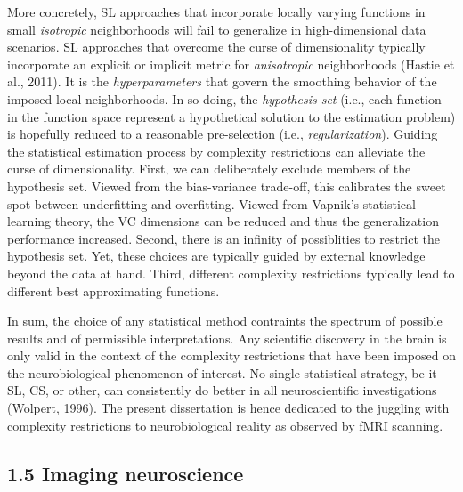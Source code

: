 \documentclass[authoryear,review,3p]{elsarticle}
\begin{document}
More concretely,
SL approaches that incorporate locally varying functions
in small \textit{isotropic} neighborhoods
will fail to generalize in high-dimensional data scenarios.
SL approaches that overcome the curse of dimensionality typically
incorporate an explicit or implicit metric for
\textit{anisotropic} neighborhoods
(Hastie et al., 2011).
%
It is the \textit{hyperparameters} that govern the
smoothing behavior of the imposed local neighborhoods.
%
In so doing,
the \textit{hypothesis set} (i.e., each function in the function space
represent a hypothetical solution to
the estimation problem) is hopefully reduced to
a reasonable pre-selection (i.e., \textit{regularization}).
%
Guiding the statistical estimation process by
complexity restrictions can alleviate the curse of dimensionality.
First,
we can deliberately exclude members of the hypothesis set.
Viewed from the bias-variance trade-off, this calibrates
the sweet spot between underfitting and overfitting.
Viewed from Vapnik's statistical learning theory,
the VC dimensions can be reduced and thus the generalization performance
increased.
%
Second, there is an infinity of possiblities to restrict the hypothesis set.
Yet, these choices are typically guided by external knowledge beyond
the data at hand.
%
Third,
different complexity restrictions typically lead to different
best approximating functions.


In sum,
the choice of any statistical method contraints
the spectrum of possible results and of permissible interpretations.
Any scientific discovery in the brain is only valid in the
context of the complexity restrictions that have been imposed
on the neurobiological phenomenon of interest.
%
No single statistical strategy, be it SL, CS, or other,
can consistently
do better in all neuroscientific investigations
(Wolpert, 1996).
%
The present dissertation
is hence dedicated to the juggling with
complexity restrictions to
neurobiological reality as observed by fMRI scanning.



\subsection*{1.5 Imaging neuroscience}
\end{document}

